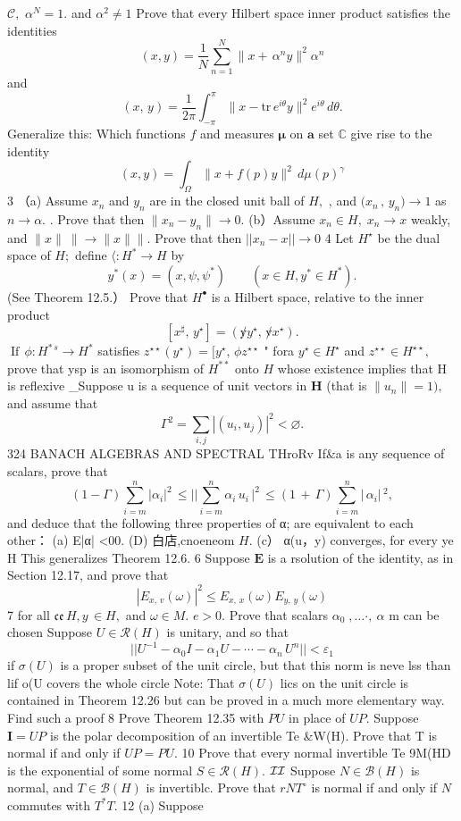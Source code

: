 ${\mathcal{C}},$ $\alpha^{N}=1.$ and $\alpha^{2}\neq1$ Prove that every Hilbert space inner product satisfies the identities $$ (x,y)=\frac{1}{N}\sum_{n=1}^{N}\|x+\,\alpha^{n}y\|^{2}\alpha^{n} $$ and $$ (x,\,y)=\frac{1}{2\pi}\int_{-\pi}^{\pi}\|x-\mathrm{tr}\,e^{i\theta}y\|^{2}e^{i\theta}\,d\theta. $$ Generalize this: Which functions $\boldsymbol{\mathit{f}}$ and measures ${\boldsymbol{\mu}}$ on $\scriptstyle{\mathbf{a}}$ set $\mathbb{C}$ give rise to the identity $$ (x,y)=\int_{\Omega}\|x+f(p)y\|^{2}\,d\mu(p)^{\gamma} $$ 3 （a) Assume $x_{n}$ and $y_{n}$ are in the closed unit ball of $\textstyle H,$ , and ${\bigl(}x_{n}\,,\,y_{n}{\bigr)}\to1$ as $n\to\alpha.$ . Prove that then $\|x_{n}-y_{n}\|\to0.$ (b）Assume $x_{n}\in H,\;x_{n}\to x$ weakly, and ${\|x\|\ \|}\to\|x\|\mathbf{\|}.$ Prove that then $||x_{n}-x||\to0$ 4 Let $H^{\star}$ be the dual space of $H;$ define $\textstyle\langle:H^{*}\to H$ by $$ y^{*}(x)=(x,\psi,\!\!\!\psi^{*})\qquad(x\in H,y^{*}\in H^{*}). $$ (See Theorem 12.5.） Prove that $H^{\bullet}$ is a Hilbert space, relative to the inner product $$ [x^{\sharp},\,y^{\star}]=(\not y y^{\star},\,\not v x^{\star}). $$ $\operatorname{If}\,\phi\colon H^{*\,s}\to H^{*}$ satisfies $z^{\star\star}(y^{\star})=[y^{\star},\,\phi z^{\star\star}$ " fora $y^{\star}\in H^{\star}$ and $z^{\star\star}\in H^{\star\star},$ prove that ysp is an isomorphism of $H^{\ast\ast}$ onto $H$ whose existence implies that H is reflexive _Suppose {u} is a sequence of unit vectors in ${\boldsymbol{H}}$ (that is $\|u_{n}\|=1),$ and assume that $$ \Gamma^{2}=\sum_{i,j}|(u_{i},u_{j})|^{2}<\varnothing. $$324 BANACH ALGEBRAS AND SPECTRAL THroRv If{&a} is any sequence of scalars, prove that $$ (1-\Gamma)\sum_{i=m}^{n}|\alpha_{i}|^{2}\,\leq\Big|\Big|\sum_{i=m}^{n}\alpha_{i}\,u_{i}\,\Big|^{2}\,\leq(1\,+\,\Gamma)\sum_{i=m}^{n}|\,\alpha_{i}|\,^{2}, $$ and deduce that the following three properties of {α;} are equivalent to each other： (a) E|α| <00. (D) 白店,cnoeneom $\textstyle H.$ (c） α(u，y) converges, for every ye H This generalizes Theorem 12.6. 6 Suppose $\boldsymbol{E}$ is a rsolution of the identity, as in Section 12.17, and prove that $$ |E_{x,\,v}(\omega)|^{2}\leq E_{x,\,x}(\omega)E_{y,\,y}(\omega) $$ 7 for all ${\mathfrak{c e}}\,H,y\,\in H,$ and $\omega\in M.$ $\scriptstyle{e>0.}$ Prove that scalars $\alpha_{0}\;,\ldots\cdot,\ \alpha$ m can be chosen Suppose $U\in{\mathcal{R}}(H)$ is unitary, and so that $$ ||U^{-1}-\alpha_{0}I-\alpha_{1}U-\cdots-\alpha_{n}\,U^{n}||<\varepsilon_{1} $$ if $\sigma(U)$ is a proper subset of the unit circle, but that this norm is neve lss than lif o(U covers the whole circle Note: That $\sigma(U)$ lics on the unit circle is contained in Theorem 12.26 but can be proved in a much more elementary way. Find such a proof 8 Prove Theorem 12.35 with $P U$ in place of $U P.$ Suppose ${\boldsymbol{I}}=U P$ is the polar decomposition of an invertible Te &W(H). Prove that T is normal if and only if $U P=P U.$ 10 Prove that every normal invertible Te 9M(HD is the exponential of some normal $S\in{\mathcal{R}}(H).$ ${\cal I}{\cal I}$ Suppose $N\in{\mathcal{B}}(H)$ is normal, and $T\in{\mathcal{B}}(H)$ is invertiblc. Prove that $r N T^{\circ}$ is normal if and only if ${\mathbf{}}N$ commutes with $T^{*}T.$ 12 (a) Suppose 